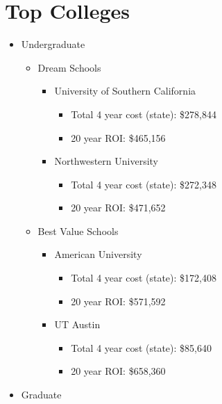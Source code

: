 \section{Top Colleges}
\begin{itemize}
    \item{Undergraduate} 
    \begin{itemize}
        \item{Dream Schools}
            \begin{itemize}
                \item{University of Southern California}
                    \begin{itemize}
                        \item{Total 4 year cost (state):} \$278,844
                        \item{20 year ROI:} \$465,156
                    \end{itemize}
                \item{Northwestern University}
                    \begin{itemize}
                        \item{Total 4 year cost (state):} \$272,348
                        \item{20 year ROI:} \$471,652
                    \end{itemize}
            \end{itemize}
        \item{Best Value Schools} 
            \begin{itemize}
                \item{American University}
                    \begin{itemize}
                        \item{Total 4 year cost (state):} \$172,408
                        \item{20 year ROI:} \$571,592
                    \end{itemize}
                \item{UT Austin}
                    \begin{itemize}
                        \item{Total 4 year cost (state):} \$85,640
                        \item{20 year ROI:} \$658,360
                    \end{itemize}
            \end{itemize}
    \end{itemize}
    \item{Graduate} 

\end{itemize}
